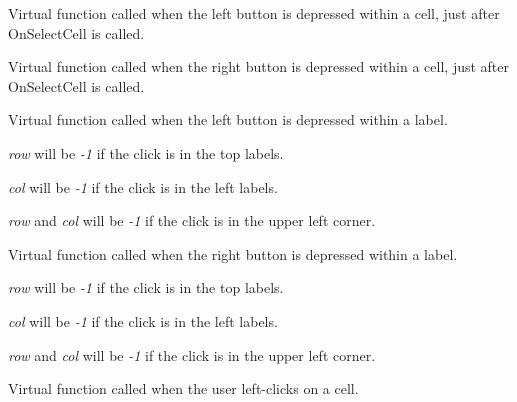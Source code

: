 
Virtual function called when the left button is depressed within a cell, just after OnSelectCell is called.

\label{wxgridoncellrightclick}


Virtual function called when the right button is depressed within a cell, just after OnSelectCell is called.

\label{wxgridonlabelleftclick}


Virtual function called when the left button is depressed within a
label.  

{\it row} will be {\it -1} if the click is in the top labels.

{\it col} will be {\it -1} if the click is in the left labels.

{\it row} and {\it col} will be {\it -1} if the click is in the upper
left corner.

\label{wxgridonlabelrightclick}


Virtual function called when the right button is depressed within a label.

{\it row} will be {\it -1} if the click is in the top labels.

{\it col} will be {\it -1} if the click is in the left labels.

{\it row} and {\it col} will be {\it -1} if the click is in the upper
left corner.

\label{wxgridonselectcell}


Virtual function called when the user left-clicks on a cell.

\label{wxgridonselectcellimplementation}

